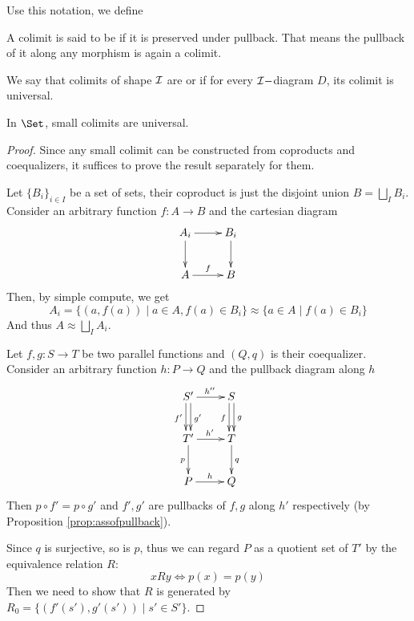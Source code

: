   Use this notation, we define
  \begin{defn}
    A colimit is said to be  if it is preserved under pullback. That means the pullback of it along any morphism is again a colimit.
  \end{defn}
  \begin{rem}
    We say that colimits of shape ${\cal I}$ are  or  if for every ${\cal I}-$diagram $D$, its colimit is universal.
  \end{rem}

  \begin{thm}
    In $\Set$, small colimits are universal.
  \end{thm}
  \begin{proof}
    Since any small colimit can be constructed from coproducts and coequalizers, it suffices to prove the result separately for them.

    Let $\{B_i\}_{i\in I}$ be a set of sets, their coproduct is just the disjoint union $B=\bigsqcup_I B_i$. Consider an arbitrary function $f\colon A\to B$ and the cartesian diagram
    \begin{displaymath}
      \xymatrix{
        A_i\ar[d]\ar[r]&B_i\ar[d]
        \\
        A\ar[r]^{f}&B
        }
    \end{displaymath}
    Then, by simple compute, we get
    \begin{equation*}
      A_i = \{(a,f(a))\mid a\in A, f(a)\in B_i\} \approx \{a\in A\mid f(a)\in B_i\}
    \end{equation*}
    And thus $A\approx\bigsqcup_I A_i$.

    Let $f,g\colon S\to T$ be two parallel functions and $(Q,q)$ is their coequalizer. Consider an arbitrary function $h\colon P\to Q$ and the pullback diagram along $h$
    \begin{displaymath}
      \xymatrix{
        S'\ar[r]^{h''}\ar@<-0.5ex>[d]_{f'}\ar@<0.5ex>[d]^{g'}
        &S\ar@<-0.5ex>[d]_{f}\ar@<0.5ex>[d]^{g}
        \\
        T'\ar[d]_{p}\ar[r]^{h'}&T\ar[d]^{q}
        \\
        P\ar[r]^{h}&Q
        }
    \end{displaymath}
    Then $p\circ f' = p\circ g'$ and $f',g'$ are pullbacks of $f,g$ along $h'$ respectively (by Proposition \ref{prop:assofpullback}).

    Since $q$ is surjective, so is $p$, thus we can regard $P$ as a quotient set of $T'$ by the equivalence relation $R$:
    \begin{equation*}
      xR y \iff p(x)=p(y)
    \end{equation*}
    Then we need to show that $R$ is generated by $R_0=\{(f'(s'),g'(s'))\mid s'\in S'\}$.


\end{proof}
